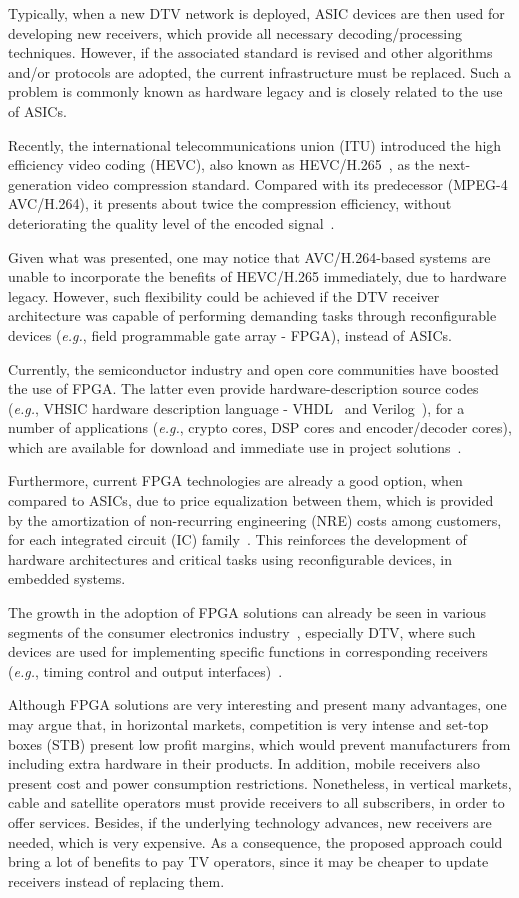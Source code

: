 Typically, when a new DTV network is deployed, ASIC devices are then used for developing new receivers, which provide all necessary decoding/processing techniques. However, if the associated standard is revised and other algorithms and/or protocols are adopted, the current infrastructure must be replaced. Such a problem is commonly known as hardware legacy and is closely related to the use of ASICs.

Recently, the international telecommunications union (ITU) introduced the high efficiency video coding (HEVC), also known as HEVC/H.265~\cite{ref2,ref3}, as the next-generation video compression standard. Compared with its predecessor (MPEG-4 AVC/H.264), it presents about twice the compression efficiency, without deteriorating the quality level of the encoded signal~\cite{ref4}.

Given what was presented, one may notice that AVC/H.264-based systems are unable to incorporate the benefits of HEVC/H.265 immediately, due to hardware legacy. However, such flexibility could be achieved if the DTV receiver architecture was capable of performing demanding tasks through reconfigurable devices ({\em e.g.}, field programmable gate array - FPGA), instead of ASICs.

Currently, the semiconductor industry and open core communities have boosted the use of FPGA. The latter even provide hardware-description source codes ({\em e.g.}, VHSIC hardware description language - VHDL~\cite{ref5} and Verilog~\cite{ref6}), for a number of applications ({\em e.g.}, crypto cores, DSP cores and encoder/decoder cores), which are available for download and immediate use in project solutions~\cite{ref7}.

Furthermore, current FPGA technologies are already a good option, when compared to ASICs, due to price equalization between them, which is provided by the amortization of non-recurring engineering (NRE) costs among customers, for each integrated circuit (IC) family~\cite{ref8,ref9}. This reinforces the development of hardware architectures and critical tasks using reconfigurable devices, in embedded systems. 

The growth in the adoption of FPGA solutions can already be seen in various segments of the consumer electronics industry~\cite{ref10}, especially DTV, where such devices are used for implementing specific functions in corresponding receivers ({\em e.g.}, timing control and output interfaces)~\cite{ref11}.

Although FPGA solutions are very interesting and present many advantages, one may argue that, in horizontal markets, competition is very intense and set-top boxes (STB) present low profit margins, which would prevent manufacturers from including extra hardware in their products. In addition, mobile receivers also present cost and power consumption restrictions. Nonetheless, in vertical markets, cable and satellite operators must provide receivers to all subscribers, in order to offer services. Besides, if the underlying technology advances, new receivers are needed, which is very expensive. As a consequence, the proposed approach could bring a lot of benefits to pay TV operators, since it may be cheaper to update receivers instead of replacing them.

